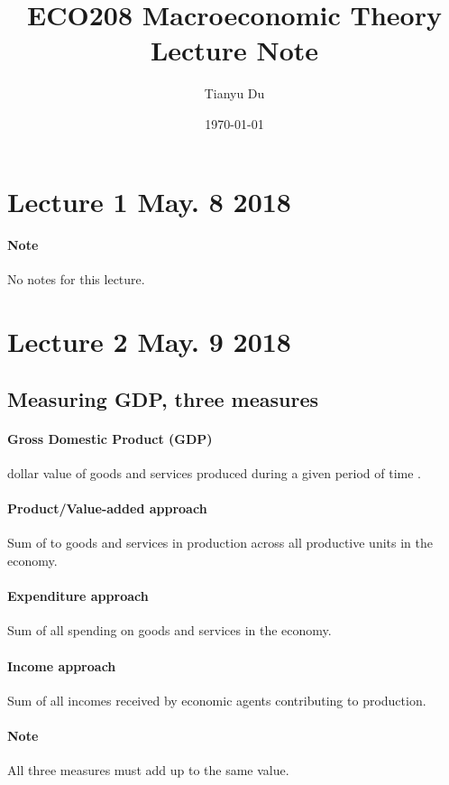 \documentclass[11pt]{article}
\title{ECO208 Macroeconomic Theory \\ Lecture Note}
\author{Tianyu Du}
\date{\today}
\begin{document}
\maketitle
\doclicenseThis
\tableofcontents

\section{Lecture 1 May. 8 2018}
\paragraph{Note} No notes for this lecture.


\section{Lecture 2 May. 9 2018}

\subsection{Measuring GDP, three measures}
	\paragraph{Gross Domestic Product (GDP)} dollar value of goods and services produced during a given period of time .
	
	\paragraph{Product/Value-added approach} Sum of  to goods and services in production across all productive units in the economy.
	
	\paragraph{Expenditure approach} Sum of all spending on goods and services in the economy.
	
	\paragraph{Income approach} Sum of all incomes received by economic agents contributing to production.

	\paragraph{Note} All three measures must add up to the same value.
\end{document}
